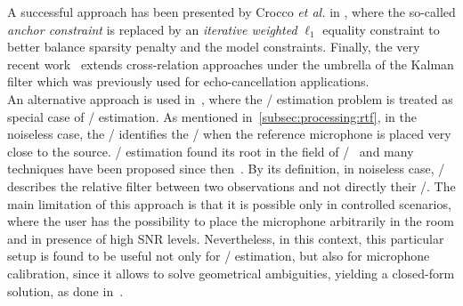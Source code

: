 A successful approach has been presented by Crocco \textit{et al.} in , where the so-called \textit{anchor constraint} is replaced by an \textit{iterative weighted} $\ell_1$ equality constraint to better balance sparsity penalty and the model constraints.
Finally, the very recent work~ extends cross-relation approaches under the umbrella of the Kalman filter which was previously used for echo-cancellation applications.
\\An alternative approach is used in~, where the \RIR/ estimation problem is treated as special case of \RTF/ estimation.
As mentioned in~\cref{subsec:processing:rtf}, in the noiseless case, the \RTF/ identifies the \RIR/ when the reference microphone is placed very close to the source.
\RTF/ estimation found its root in the field of \SEdef/~ and many techniques have been proposed since then~.
By its definition, in noiseless case, \RTF/ describes the relative filter between two observations and not directly their \RIRs/.
The main limitation of this approach is that it is possible only in controlled scenarios, where the user has the possibility to place the microphone arbitrarily in the room and in presence of high \ac{SNR} levels.
Nevertheless, in this context, this particular setup is found to be useful not only for \RTF/ estimation, but also for microphone calibration, since it allows to solve geometrical ambiguities, yielding a closed-form solution, as done in~.

